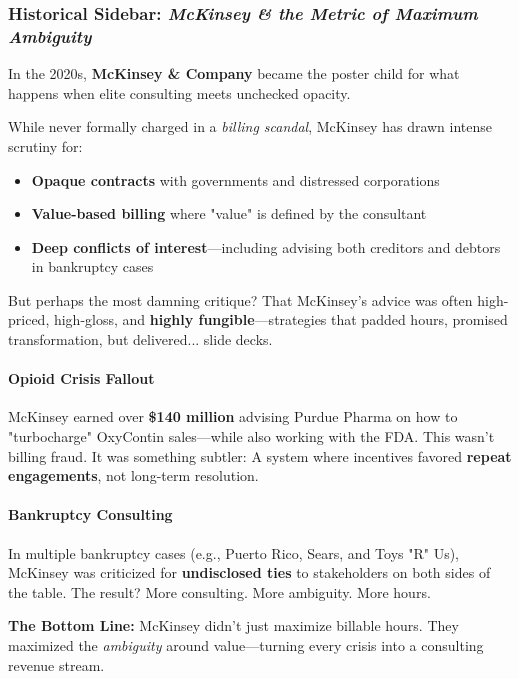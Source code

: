 \subsubsection*{Historical Sidebar: \textit{McKinsey \& the Metric of Maximum Ambiguity}}

In the 2020s, \textbf{McKinsey \& Company} became the poster child for what happens when elite consulting meets unchecked opacity.

While never formally charged in a \textit{billing scandal}, McKinsey has drawn intense scrutiny for:

\begin{itemize}
    \item \textbf{Opaque contracts} with governments and distressed corporations  
    \item \textbf{Value-based billing} where "value" is defined by the consultant  
    \item \textbf{Deep conflicts of interest}—including advising both creditors and debtors in bankruptcy cases
\end{itemize}

But perhaps the most damning critique?  
That McKinsey’s advice was often high-priced, high-gloss, and \textbf{highly fungible}—strategies that padded hours, promised transformation, but delivered... slide decks.

\paragraph{Opioid Crisis Fallout}
McKinsey earned over \textbf{\$140 million} advising Purdue Pharma on how to "turbocharge" OxyContin sales—while also working with the FDA.  
This wasn’t billing fraud.  
It was something subtler:  
A system where incentives favored \textbf{repeat engagements}, not long-term resolution.

\paragraph{Bankruptcy Consulting}
In multiple bankruptcy cases (e.g., Puerto Rico, Sears, and Toys "R" Us), McKinsey was criticized for \textbf{undisclosed ties} to stakeholders on both sides of the table.  
The result? More consulting. More ambiguity. More hours.

\bigskip

\noindent\textbf{The Bottom Line:}  
McKinsey didn’t just maximize billable hours.  
They maximized the \textit{ambiguity} around value—turning every crisis into a consulting revenue stream.